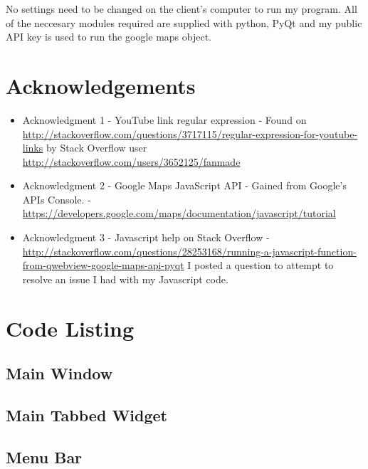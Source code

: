 No settings need to be changed on the client's computer to run my program. All of the neccesary modules required are supplied with python, PyQt and my public API key is used to run the google maps object.





\section{Acknowledgements}

\begin{itemize}
\item Acknowledgment 1 - YouTube link regular expression - Found on \url{http://stackoverflow.com/questions/3717115/regular-expression-for-youtube-links} by Stack Overflow user \url{http://stackoverflow.com/users/3652125/fanmade}
\item Acknowledgment 2 - Google Maps JavaScript API - Gained from Google's APIs Console. - \url{https://developers.google.com/maps/documentation/javascript/tutorial}
\item Acknowledgment 3 - Javascript help on Stack Overflow - \url{http://stackoverflow.com/questions/28253168/running-a-javascript-function-from-qwebview-google-maps-api-pyqt} I posted a question to attempt to resolve an issue I had with my Javascript code.
\end{itemize}

\section{Code Listing}

\subsection{Main Window}


\subsection{Main Tabbed Widget}


\subsection{Menu Bar}




